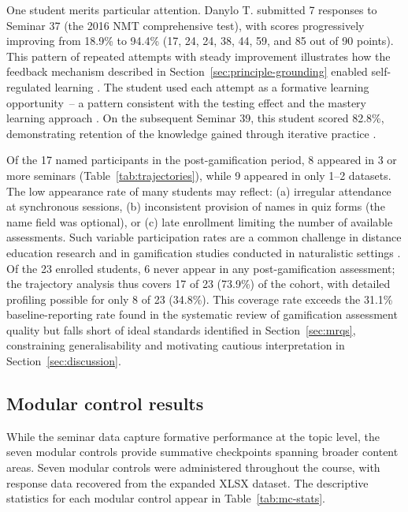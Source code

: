 One student merits particular attention. Danylo T. submitted 7 responses to Seminar 37 (the 2016 NMT comprehensive test), with scores progressively improving from 18.9\% to 94.4\% (17, 24, 24, 38, 44, 59, and 85 out of 90 points). This pattern of repeated attempts with steady improvement illustrates how the feedback mechanism described in Section~\ref{sec:principle-grounding} enabled self-regulated learning \cite{Bonwell1991}. The student used each attempt as a formative learning opportunity~-- a pattern consistent with the testing effect \cite{RoedigerButler2011, Dunlosky2013} and the mastery learning approach \cite{Hattie2009, HattieTimperley2007}. On the subsequent Seminar 39, this student scored 82.8\%, demonstrating retention of the knowledge gained through iterative practice \cite{Sailer2017, 17Manzanares2019, Zhonggen2019}.

Of the 17 named participants in the post-gamification period, 8 appeared in 3 or more seminars (Table~\ref{tab:trajectories}), while 9 appeared in only 1--2 datasets. The low appearance rate of many students may reflect: (a) irregular attendance at synchronous sessions, (b) inconsistent provision of names in quiz forms (the name field was optional), or (c) late enrollment limiting the number of available assessments. Such variable participation rates are a common challenge in distance education research \cite{UNESCO2023} and in gamification studies conducted in naturalistic settings \cite{Deterding2011, Hung201757}. Of the 23 enrolled students, 6 never appear in any post-gamification assessment; the trajectory analysis thus covers 17 of 23 (73.9\%) of the cohort, with detailed profiling possible for only 8 of 23 (34.8\%). This coverage rate exceeds the 31.1\% baseline-reporting rate found in the systematic review of gamification assessment quality \cite{Korniienko2025mrqs} but falls short of ideal standards identified in Section~\ref{sec:mrqs}, constraining generalisability and motivating cautious interpretation in Section~\ref{sec:discussion}.

\subsection{Modular control results}

While the seminar data capture formative performance at the topic level, the seven modular controls provide summative checkpoints spanning broader content areas. Seven modular controls were administered throughout the course, with response data recovered from the expanded XLSX dataset. The descriptive statistics for each modular control appear in Table~\ref{tab:mc-stats}.

